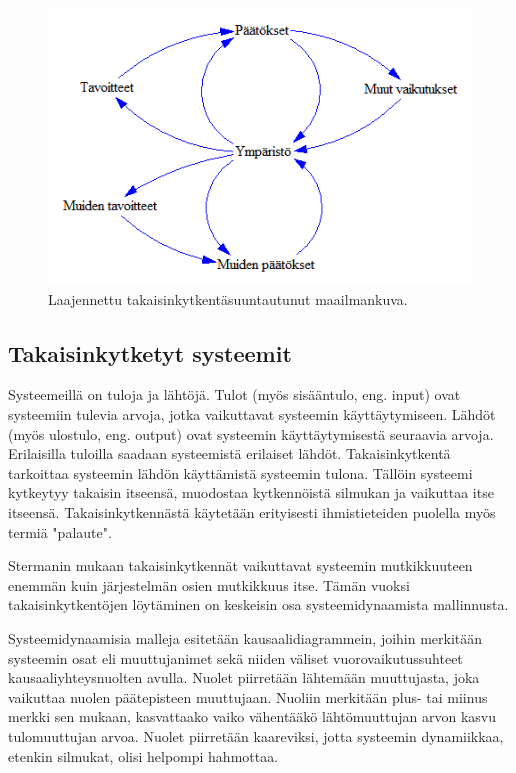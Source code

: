 \documentclass[finnish,12pt,a4paper,pdftex]{article}
\begin{document}
\begin{onehalfspacing}
\begin{figure}[H]
\centering \includegraphics{laajennettutakaisinkytkentasuuntautunut}
\caption{Laajennettu takaisinkytkentäsuuntautunut maailmankuva. \cite[s. 11]{Sterman2000} \label{sysdyn:laajennettutakaisinkytkentasuuntautunut}}
\end{figure}


\subsection{Takaisinkytketyt systeemit \label{sysdyn:takaisinkytkenta}}

Systeemeillä on tuloja ja lähtöjä. Tulot (myös sisääntulo, eng. input) ovat systeemiin tulevia arvoja, jotka vaikuttavat systeemin käyttäytymiseen. Lähdöt (myös ulostulo, eng. output) ovat systeemin käyttäytymisestä seuraavia arvoja. Erilaisilla tuloilla saadaan systeemistä erilaiset lähdöt. Takaisinkytkentä tarkoittaa systeemin lähdön käyttämistä systeemin tulona. Tällöin systeemi kytkeytyy takaisin itseensä, muodostaa kytkennöistä silmukan ja vaikuttaa itse itseensä. Takaisinkytkennästä käytetään erityisesti ihmistieteiden puolella myös termiä "palaute". \cite{Sterman2000, WhatIsSystemDynamics} %

Stermanin \cite[s. 12]{Sterman2000} mukaan takaisinkytkennät vaikuttavat systeemin mutkikkuuteen enemmän kuin järjestelmän osien mutkikkuus itse. Tämän vuoksi takaisinkytkentöjen löytäminen on keskeisin osa systeemidynaamista mallinnusta. 

Systeemidynaamisia malleja esitetään kausaalidiagrammein, joihin merkitään systeemin osat eli muuttujanimet sekä niiden väliset vuorovaikutussuhteet kausaaliyhteysnuolten avulla. Nuolet piirretään lähtemään muuttujasta, joka vaikuttaa nuolen päätepisteen muuttujaan. Nuoliin merkitään plus- tai miinus merkki sen mukaan, kasvattaako vaiko vähentääkö lähtömuuttujan arvon kasvu tulomuuttujan arvoa. Nuolet piirretään kaareviksi, jotta systeemin dynamiikkaa, etenkin silmukat, olisi helpompi hahmottaa. \cite{Sterman2000}


\end{onehalfspacing}
\end{document}
